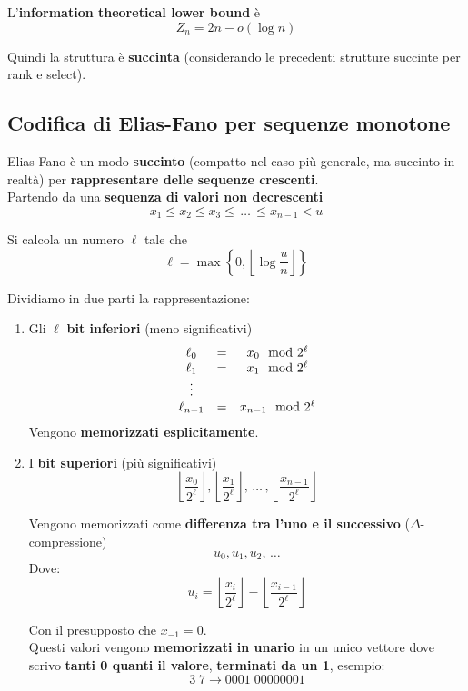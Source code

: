 L'\textbf{information theoretical lower bound} è 
$$ Z_n = 2n - o (\log n)$$

Quindi la struttura è \textbf{succinta} (considerando le precedenti strutture succinte per rank e select).\\

\newpage

\subsection{Codifica di Elias-Fano per sequenze monotone}
Elias-Fano è un modo \textbf{succinto} (compatto nel caso più generale, ma succinto in realtà) per \textbf{rappresentare delle sequenze crescenti}.\\

Partendo da una \textbf{sequenza di valori non decrescenti}
$$ x_1 \leq x_2 \leq x_3 \leq \, \dots \, \leq x_{n-1} < u $$

Si calcola un numero $\ell$ tale che
$$ \ell = \max \left\{0, \left\lfloor \log \frac{u}{n} \right\rfloor\right\} $$

Dividiamo in due parti la rappresentazione:
\begin{enumerate}
	\item Gli $\ell$ \textbf{bit inferiori} (meno significativi)
	$$ 
	\begin{array}{c c c}
		\ell_0 & = & x_0 \mod 2^\ell \\
		\ell_1 & = & x_1 \mod 2^\ell \\
		\vdots && \\
		\ell_{n-1} & = & x_{n-1} \mod 2^\ell \\
	\end{array}
	$$
	Vengono \textbf{memorizzati esplicitamente}.\\
	
	\item I \textbf{bit superiori} (più significativi)
	$$ \left\lfloor \frac{x_0}{2^\ell} \right\rfloor, \left\lfloor \frac{x_1}{2^\ell} \right\rfloor, \, \dots \, , \left\lfloor \frac{x_{n-1}}{2^\ell} \right\rfloor $$
	
	Vengono memorizzati come \textbf{differenza tra l'uno e il successivo} ($\Delta$-compressione)
	$$ u_0, u_1, u_2, \, \dots $$
	Dove: 
	$$ u_i = \left\lfloor \frac{x_i}{2^\ell} \right\rfloor - \left\lfloor \frac{x_{i-1}}{2^\ell} \right\rfloor$$
	
	Con il presupposto che $x_{-1} =0$.\\
	Questi valori vengono \textbf{memorizzati in unario} in un unico vettore dove scrivo \textbf{tanti 0 quanti il valore}, \textbf{terminati da un 1}, esempio:
	$$ 3\; 7 \rightarrow 0001 \; 00000001 $$
\end{enumerate}

